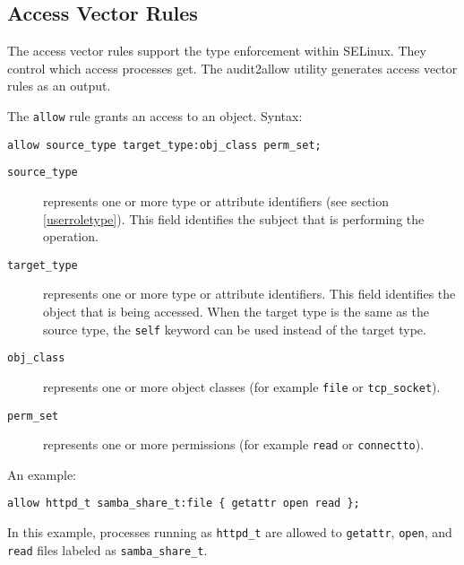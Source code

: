 \subsection{Access Vector Rules}
\label{avrules}
The access vector rules support the type enforcement within SELinux. They
control which access processes get. The audit2allow utility generates access
vector rules as an output.

The \texttt{allow} rule grants an access to an object. Syntax:
\begin{lstlisting}[language=te]
allow source_type target_type:obj_class perm_set;
\end{lstlisting}
\begin{description}
    \item [\texttt{source\_type}] represents one or more type or attribute
        identifiers (see section \ref{userroletype}). This field identifies the
        subject that is performing the operation.
    \item [\texttt{target\_type}] represents one or more type or attribute
        identifiers.  This field identifies the object that is being accessed.
        When the target type is the same as the source type, the \texttt{self}
        keyword can be used instead of the target type.
    \item [\texttt{obj\_class}] represents one or more object classes (for
        example \texttt{file} or \texttt{tcp\_socket}).
    \item [\texttt{perm\_set}] represents one or more permissions (for example
        \texttt{read} or \texttt{connectto}).
\end{description}
An example:
\begin{lstlisting}[language=te]
allow httpd_t samba_share_t:file { getattr open read };
\end{lstlisting}
In this example, processes running as \texttt{httpd\_t} are allowed to
\texttt{getattr}, \texttt{open}, and \texttt{read} files labeled as
\texttt{samba\_share\_t}.

